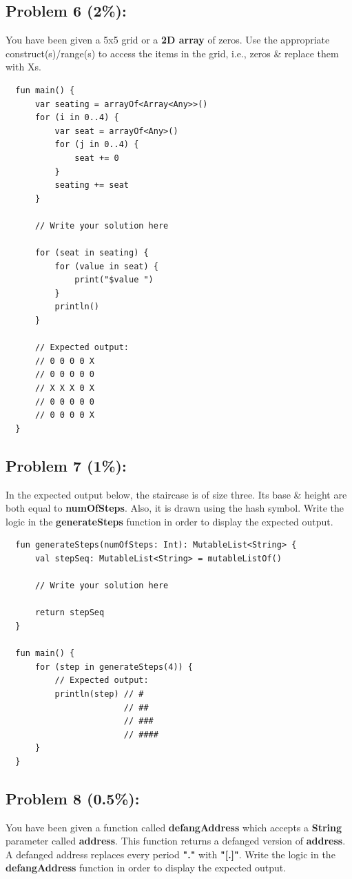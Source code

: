 \documentclass{article}
\begin{document}
\subsection*{Problem 6 (2\%):}
You have been given a 5x5 grid or a \textbf{2D array} of zeros. Use the appropriate construct(s)/range(s) to access the items in the grid, i.e., zeros \& replace them with Xs.

\begin{verbatim}
  fun main() {
      var seating = arrayOf<Array<Any>>()
      for (i in 0..4) {
          var seat = arrayOf<Any>()
          for (j in 0..4) {
              seat += 0
          }
          seating += seat
      }

      // Write your solution here

      for (seat in seating) {
          for (value in seat) {
              print("$value ")
          }
          println()
      }

      // Expected output:
      // 0 0 0 0 X 
      // 0 0 0 0 0 
      // X X X 0 X 
      // 0 0 0 0 0 
      // 0 0 0 0 X
  }
\end{verbatim}

\subsection*{Problem 7 (1\%):}
In the expected output below, the staircase is of size three. Its base \& height are both equal to \textbf{numOfSteps}. Also, it is drawn using the hash symbol. Write the logic in the \textbf{generateSteps} function in order to display the expected output.

\begin{verbatim}
  fun generateSteps(numOfSteps: Int): MutableList<String> {
      val stepSeq: MutableList<String> = mutableListOf()
      
      // Write your solution here
      
      return stepSeq  
  }

  fun main() {
      for (step in generateSteps(4)) {
          // Expected output:
          println(step) // #  
                        // ## 
                        // ###
                        // ####
      }
  }
\end{verbatim}

\subsection*{Problem 8 (0.5\%):}
You have been given a function called \textbf{defangAddress} which accepts a \textbf{String} parameter called \textbf{address}. This function returns a defanged version of \textbf{address}. A defanged address replaces every period \textbf{"."} with \textbf{"[.]"}. Write the logic in the \textbf{defangAddress} function in order to display the expected output.
\end{document}
